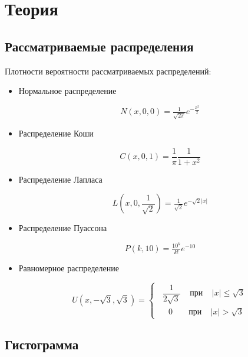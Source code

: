 \section{Теория}

\subsection{Рассматриваемые распределения}

Плотности вероятности рассматриваемых распределений: 

\begin{itemize}
	\item Нормальное распределение
	
	\begin{equation}
		N(x, 0, 0) = \tfrac{1}{ \sqrt{2\pi}}e^{-\tfrac{x^2}{2}}
	\end{equation}
	
	\item Распределение Коши
	
	\begin{equation}
		C(x, 0, 1) = \dfrac{1}{\pi}\dfrac{1}{1 + x^2}
	\end{equation}
	
	\item Распределение Лапласа
	
	\begin{equation}
		L(x, 0, \frac{1}{\sqrt{2}}) =\tfrac{1}{\sqrt{2}}e^{-\sqrt{2}|x|}
	\end{equation}
	
	\item Распределение Пуассона
	
	\begin{equation}
		P(k, 10) = \tfrac{10^k}{k!}e^{-10}
	\end{equation}
	
	\item Равномерное распределение
	
	\begin{equation}
		U(x, -\sqrt{3}, \sqrt{3}) =
		\begin{cases} 
			\;\; \dfrac{1}{2\sqrt{3}} \;\;\;\; \text{при} \;\;\;\; |x| \leq \sqrt{3}\\
			\,\,\,\:\;\; 0 \;\;\;\;\;\;\; \text{при} \;\;\;\; |x| > \sqrt{3}
		\end{cases}
	\end{equation}
	
\end{itemize}

\subsection{Гистограмма}

